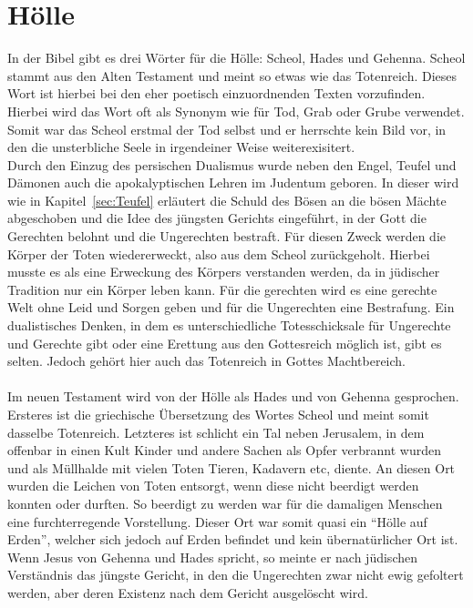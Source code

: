 \section{Hölle}
In der Bibel gibt es drei Wörter für die Hölle: Scheol, Hades und Gehenna. Scheol stammt aus den Alten Testament und meint so etwas wie das Totenreich.
Dieses Wort ist hierbei bei den eher poetisch einzuordnenden Texten vorzufinden. Hierbei wird das Wort oft als Synonym wie für Tod, Grab oder Grube verwendet.
Somit war das Scheol erstmal der Tod selbst und er herrschte kein Bild vor, in den die unsterbliche Seele in irgendeiner Weise weiterexisitert.
\\
Durch den Einzug des persischen Dualismus wurde neben den Engel, Teufel und Dämonen auch die apokalyptischen Lehren im Judentum geboren. In dieser
wird wie in Kapitel\ \ref{sec:Teufel} erläutert die Schuld des Bösen an die bösen Mächte abgeschoben und die Idee des jüngsten Gerichts eingeführt,
in der Gott die Gerechten belohnt und die Ungerechten bestraft. Für diesen Zweck werden die Körper der Toten wiedererweckt, also aus dem Scheol zurückgeholt.
Hierbei musste es als eine Erweckung des Körpers verstanden werden, da in jüdischer Tradition nur ein Körper leben kann. Für die gerechten
wird es eine gerechte Welt ohne Leid und Sorgen geben und für die Ungerechten eine Bestrafung. Ein dualistisches Denken, in dem es unterschiedliche 
Totesschicksale für Ungerechte und Gerechte gibt oder eine Erettung aus den Gottesreich möglich ist, gibt es selten.  Jedoch gehört hier auch das 
Totenreich in Gottes Machtbereich.
\\~\\
Im neuen Testament wird von der Hölle als Hades und von Gehenna gesprochen. Ersteres ist die griechische Übersetzung des Wortes Scheol und meint somit 
dasselbe Totenreich. Letzteres ist schlicht ein Tal neben Jerusalem, in dem offenbar in einen Kult Kinder und andere Sachen als Opfer verbrannt wurden und 
als Müllhalde mit vielen Toten Tieren, Kadavern etc, diente. An diesen Ort wurden die Leichen von Toten entsorgt, wenn diese nicht beerdigt werden konnten
oder durften. So beerdigt zu werden war für die damaligen Menschen eine furchterregende Vorstellung. Dieser Ort war somit quasi ein ``Hölle auf Erden'', welcher 
sich jedoch auf Erden befindet und kein übernatürlicher Ort ist. Wenn Jesus von Gehenna und Hades spricht, so meinte er nach jüdischen Verständnis das jüngste 
Gericht, in den die Ungerechten zwar nicht ewig gefoltert werden, aber deren Existenz nach dem Gericht ausgelöscht wird.